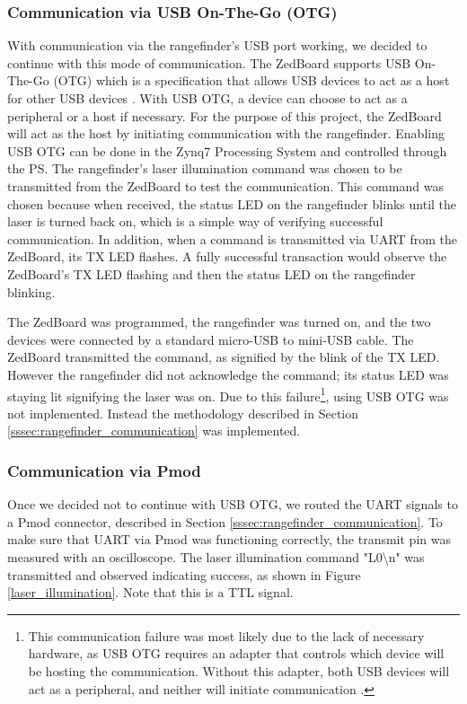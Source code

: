 \subsubsection{Communication via USB On-The-Go (OTG)}
With communication via the rangefinder's USB port working, we decided to continue with this mode of communication. The ZedBoard supports USB On-The-Go (OTG) which is a specification that allows USB devices to act as a host for other USB devices \cite{usb-otg}. With USB OTG, a device can choose to act as a peripheral or a host if necessary. For the purpose of this project, the ZedBoard will act as the host by initiating communication with the rangefinder. Enabling USB OTG can be done in the Zynq7 Processing System and controlled through the PS. The rangefinder's laser illumination command was chosen to be transmitted from the ZedBoard to test the communication. This command was chosen because when received, the status LED on the rangefinder blinks until the laser is turned back on, which is a simple way of verifying successful communication. In addition, when a command is transmitted via UART from the ZedBoard, its TX LED flashes. A fully successful transaction would observe the ZedBoard's TX LED flashing and then the status LED on the rangefinder blinking.
\par
The ZedBoard was programmed, the rangefinder was turned on, and the two devices were connected by a standard micro-USB to mini-USB cable. The ZedBoard transmitted the command, as signified by the blink of the TX LED. However the rangefinder did not acknowledge the command; its status LED was staying lit signifying the laser was on. Due to this failure\footnote{This communication failure was most likely due to the lack of necessary hardware, as USB OTG requires an adapter that controls which device will be hosting the communication. Without this adapter, both USB devices will act as a peripheral, and neither will initiate communication \cite{usb-otg}.}, using USB OTG was not implemented. Instead the methodology described in Section \ref{sssec:rangefinder_communication} was implemented.

\subsubsection{Communication via Pmod}
Once we decided not to continue with USB OTG, we routed the UART signals to a Pmod connector, described in Section \ref{sssec:rangefinder_communication}. To make sure that UART via Pmod was functioning correctly, the transmit pin was measured with an oscilloscope. The laser illumination command "L0\textbackslash{}n" was transmitted and observed indicating success, as shown in Figure \ref{laser_illumination}. Note that this is a TTL signal.

